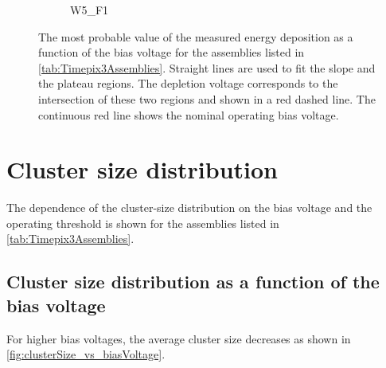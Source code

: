 \begin{figure}[htbp]
\begin{subfigure}[b]{0.33\textwidth}
    \caption{W5\_F1}
  \end{subfigure}%
  \caption{The most probable value of the measured energy deposition as
    a function of the bias voltage for the assemblies listed in
    \cref{tab:Timepix3Assemblies}. Straight lines are used to fit the
    slope and the plateau regions. The depletion voltage corresponds
    to the intersection of these two regions and shown in a red dashed
    line. The continuous red line shows the nominal operating bias
    voltage.}
  \label{fig:depletionVoltage}
\end{figure}


\newpage
\section{Cluster size distribution}

The dependence of the cluster-size distribution on the bias voltage
and the operating threshold is shown for the assemblies listed in
\cref{tab:Timepix3Assemblies}.

\subsection{Cluster size distribution as a function of the bias
  voltage}

For higher bias voltages, the average cluster size decreases as shown
in \cref{fig:clusterSize_vs_biasVoltage}.

